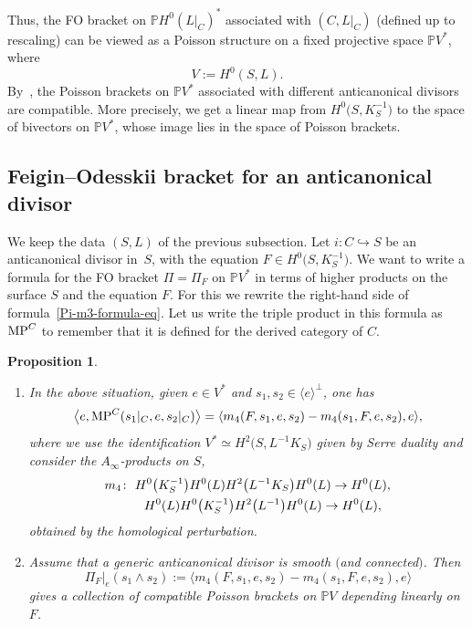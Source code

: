 \documentclass[pdftex]{sigma}
\numberwithin{equation}{section}
\newtheorem{Proposition}[Theorem]{Proposition}
 { \theoremstyle{definition}
\newtheorem{Definition}[Theorem]{Definition}
\newtheorem{Note}[Theorem]{Note}
\newtheorem{Example}[Theorem]{Example}
\newtheorem{Remark}[Theorem]{Remark}
\newtheorem{Remarks}[Theorem]{Remarks} }
\newcommand{\hra}{\hookrightarrow}
\newcommand{\we}{\wedge}
\renewcommand{\P}{{\mathbb P}}
\newcommand{\lan}{\langle}
\newcommand{\ran}{\rangle}
\begin{document}
Thus, the FO bracket on $\P H^0(L|_C)^*$ associated with $(C,L|_C)$ (defined up to rescaling) can be viewed as a Poisson structure on
a fixed projective space $\P V^*$, where
\[V:=H^0(S,L).\]
By~\cite[Theorem~4.4]{HP}, the Poisson brackets on $\P V^*$ associated with different anticanonical divisors are compatible.
More precisely, we get a linear map from $H^0\big(S,K_S^{-1}\big)$ to the space of bivectors on $\P V^*$, whose image lies in the space of Poisson brackets.

\subsection{Feigin--Odesskii bracket for an anticanonical divisor}

We keep the data $(S,L)$ of the previous subsection. Let $i\colon C\hra S$ be an anticanonical divisor in~$S$, with the equation $F\in H^0\big(S,K_S^{-1}\big)$.
We want to write a formula for the FO bracket $\Pi=\Pi_F$
on $\P V^*$ in terms of higher products on the surface $S$ and the equation $F$. For this we rewrite the right-hand side of formula~\eqref{Pi-m3-formula-eq}.
Let us write the triple product in this formula as~${\rm MP}^C$ to remember that it is defined for the derived category of $C$.

\begin{Proposition}\label{m4-prop}\quad
\begin{enumerate}\itemsep=0pt
\item[$(i)$] In the above situation,
given $e\in V^*$ and $s_1,s_2\in \lan e\ran^{\perp}$, one has
\[
\big\lan e,{\rm MP}^C(s_1|_C,e,s_2|_C)\big\ran=\lan m_4(F,s_1,e,s_2)-m_4(s_1,F,e,s_2),e\ran,\]
where we use the identification $V^*\simeq H^2\big(S,L^{-1}K_S\big)$ given by Serre duality and consider the $A_\infty$-products on $S$,
\begin{gather*}
m_4\colon \ H^0\big(K_S^{-1}\big)H^0(L)H^2\big(L^{-1}K_S\big)H^0(L)\to H^0(L), \\
\hphantom{m_4\colon}{} \ H^0(L)H^0\big(K_S^{-1}\big)H^2\big(L^{-1}\big)H^0(L)\to H^0(L),
\end{gather*}
obtained by the homological perturbation.

\item[$(ii)$] Assume that a generic anticanonical divisor is smooth $($and connected$)$. Then
\[\Pi_F|_e(s_1\we s_2):=\lan m_4(F,s_1,e,s_2)-m_4(s_1,F,e,s_2),e\ran\]
gives a collection of compatible Poisson brackets on $\P V$
depending linearly on $F$.
\end{enumerate}
\end{Proposition}
\end{document}
